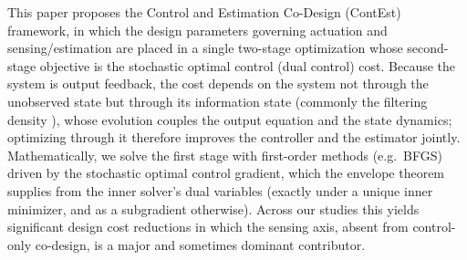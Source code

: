 \documentclass[twocolumn,amsthm]{autart}
\begin{document}
This paper proposes the Control and Estimation Co-Design (ContEst) framework, in which the design parameters governing actuation and sensing/estimation are placed in a single two-stage optimization whose second-stage objective is the stochastic optimal control (dual control) cost. Because the system is
output feedback, the cost depends on the system not through the unobserved state but through its information state (commonly the filtering density
\cite{kumar2015stochastic}), whose evolution couples the output
equation and the state dynamics; optimizing through it therefore improves the controller and the estimator jointly. Mathematically, we solve the first stage with first-order methods (e.g.\ BFGS) driven by the stochastic optimal control gradient, which the envelope theorem supplies from the inner solver's dual variables (exactly under a unique inner minimizer, and as a subgradient otherwise). Across our studies this yields significant design cost reductions in which the sensing axis, absent from control-only co-design, is a major and sometimes dominant contributor.
\end{document}
